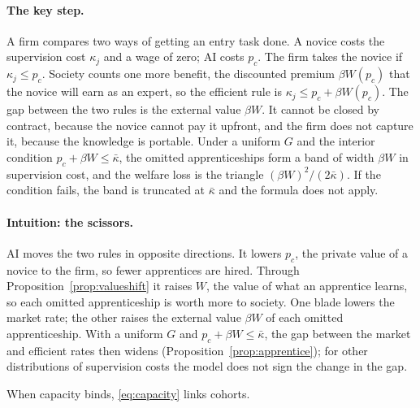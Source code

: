 \documentclass[12pt]{article}
\theoremstyle{remark}
\begin{document}
\paragraph{The key step.} A firm compares two ways of getting an entry task done. A novice costs the supervision cost $\kappa_j$ and a wage of zero; AI costs $p_c$. The firm takes the novice if $\kappa_j\le p_c$. Society counts one more benefit, the discounted premium $\beta W(p_c)$ that the novice will earn as an expert, so the efficient rule is $\kappa_j\le p_c+\beta W(p_c)$. The gap between the two rules is the external value $\beta W$. It cannot be closed by contract, because the novice cannot pay it upfront, and the firm does not capture it, because the knowledge is portable. Under a uniform $G$ and the interior condition $p_c+\beta W\le\bar\kappa$, the omitted apprenticeships form a band of width $\beta W$ in supervision cost, and the welfare loss is the triangle $(\beta W)^2/(2\bar\kappa)$. If the condition fails, the band is truncated at $\bar\kappa$ and the formula does not apply.

\paragraph{Intuition: the scissors.} AI moves the two rules in opposite directions. It lowers $p_c$, the private value of a novice to the firm, so fewer apprentices are hired. Through Proposition~\ref{prop:valueshift} it raises $W$, the value of what an apprentice learns, so each omitted apprenticeship is worth more to society. One blade lowers the market rate; the other raises the external value $\beta W$ of each omitted apprenticeship. With a uniform $G$ and $p_c+\beta W\le\bar\kappa$, the gap between the market and efficient rates then widens (Proposition~\ref{prop:apprentice}); for other distributions of supervision costs the model does not sign the change in the gap.

When capacity binds, \eqref{eq:capacity} links cohorts.
\end{document}
